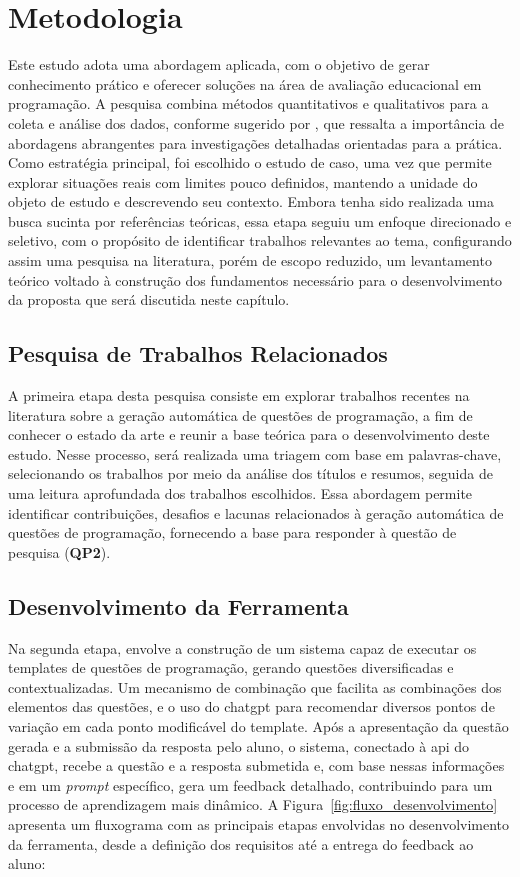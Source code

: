 \chapter{Metodologia}\label{cap:metodologia}

Este estudo adota uma abordagem aplicada, com o objetivo de gerar conhecimento prático e oferecer soluções na área de avaliação educacional em programação. A pesquisa combina métodos quantitativos e qualitativos para a coleta e análise dos dados, conforme sugerido por \parencite{Gil2017}, que ressalta a importância de abordagens abrangentes para investigações detalhadas orientadas para a prática. Como estratégia principal, foi escolhido o estudo de caso, uma vez que permite explorar situações reais com limites pouco definidos, mantendo a unidade do objeto de estudo e descrevendo seu contexto. Embora tenha sido realizada uma busca sucinta por referências teóricas, essa etapa seguiu um enfoque direcionado e seletivo, com o propósito de identificar trabalhos relevantes ao tema, configurando assim uma pesquisa na literatura, porém  de escopo reduzido, um levantamento teórico voltado à construção dos fundamentos necessário para o desenvolvimento da proposta que será discutida neste capítulo.

\section{Pesquisa de Trabalhos Relacionados}

A primeira etapa desta pesquisa consiste em explorar trabalhos recentes na literatura sobre a geração automática de questões de programação, a fim de conhecer o estado da arte e reunir a base teórica para o desenvolvimento deste estudo. Nesse processo, será realizada uma triagem com base em palavras-chave, selecionando os trabalhos por meio da análise dos títulos e resumos, seguida de uma leitura aprofundada dos trabalhos escolhidos. Essa abordagem permite identificar contribuições, desafios e lacunas relacionados à geração automática de questões de programação, fornecendo a base para responder à questão de pesquisa (\textbf{QP2}). 


\section{Desenvolvimento da Ferramenta}
Na segunda etapa, envolve a construção de um sistema capaz de executar os templates de questões de programação, gerando questões diversificadas e contextualizadas. Um mecanismo de combinação que facilita as combinações dos elementos das questões, e o uso do \gls{chatgpt} para recomendar diversos pontos de variação em cada ponto modificável do template. Após a apresentação da questão gerada e a submissão da resposta pelo aluno, o sistema, conectado à \gls{api} do \gls{chatgpt}, recebe a questão e a resposta submetida e, com base nessas informações e em um \textit{prompt} específico, gera um feedback detalhado, contribuindo para um processo de aprendizagem mais dinâmico. A Figura~\ref{fig:fluxo_desenvolvimento} apresenta um fluxograma com as principais etapas envolvidas no desenvolvimento da ferramenta, desde a definição dos requisitos até a entrega do feedback ao aluno:

